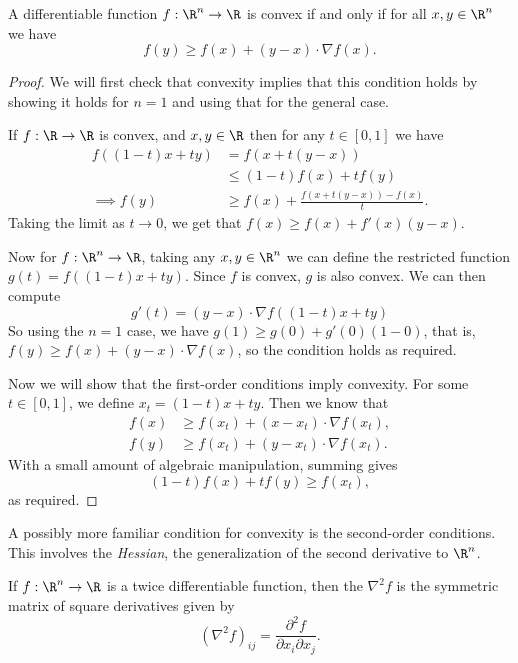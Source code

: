 \documentclass[a4paper]{scrartcl}
\begin{document}
\begin{proposition}
A differentiable function $f: \R^n \rightarrow \R$ is convex if and only if for all $x, y \in \R^n$ we have
$$
f(y) \geq f(x) + (y - x) \cdot \nabla f(x).
$$
\end{proposition}
\begin{proof}
    We will first check that convexity implies that this condition holds by showing it holds for $n = 1$ and using that for the general case. 

    If $f: \R \rightarrow \R$ is convex, and $x, y \in \R$ then for any $t \in [0, 1]$ we have
    \begin{align*}
        f((1 - t)x + ty) &= f(x + t(y - x)) \\
        & \leq (1 - t)f(x) + tf(y) \\
\implies f(y) & \geq f(x) + \frac{f(x + t(y - x)) - f(x)}{t}.
    \end{align*}
    Taking the limit as $t \rightarrow 0$, we get that $f(x) \geq f(x) + f'(x)(y - x)$.

    Now for $f: \R^n \rightarrow \R$, taking any $x, y \in \R^n$ we can define the restricted function $g(t) = f((1 - t)x + ty)$. Since $f$ is convex, $g$ is also convex. We can then compute
    $$
    g'(t) = (y - x) \cdot \nabla f((1 - t) x + ty)
    $$
    So using the $n = 1$ case, we have $g(1) \geq g(0) + g'(0) (1 - 0)$, that is, $f(y) \geq f(x) + (y - x) \cdot \nabla f(x)$, so the condition holds as required.

    Now we will show that the first-order conditions imply convexity.
    For some $t \in [0, 1]$, we define $x_t = (1 - t) x + ty$. Then we know that
    \begin{align*}
        f(x) &\geq f(x_t) + (x - x_t) \cdot \nabla f(x_t), \\
        f(y) &\geq f(x_t) + (y - x_t) \cdot \nabla f(x_t).
    \end{align*}    
    With a small amount of algebraic manipulation, summing gives 
    $$
    (1 - t)f(x) + tf(y) \geq f(x_t),
    $$
    as required.
\end{proof}

A possibly more familiar condition for convexity is the second-order conditions. This involves the \emph{Hessian}, the generalization of the second derivative to $\R^n$.

\begin{definition}[Hessian]
    If $f: \R^n \rightarrow \R$ is a twice differentiable function, then the  $\nabla^2 f$ is the symmetric matrix of square derivatives given by
    $$
    (\nabla^2 f)_{ij} = \frac{\partial^2 f}{\partial x_i \partial x_j}.
    $$
\end{definition}
\end{document}
